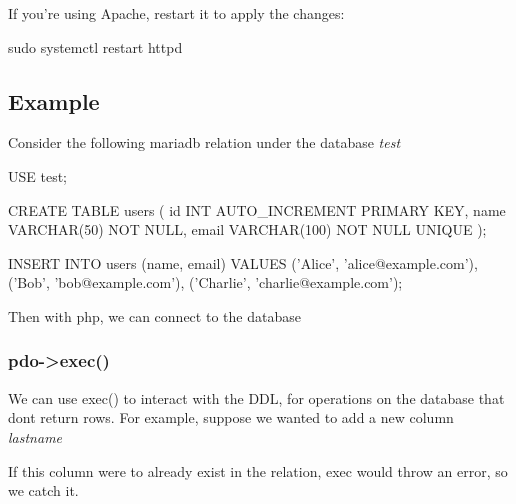 \documentclass{report}
\begin{document}
    If you’re using Apache, restart it to apply the changes:
    \bigbreak \noindent 
    \begin{bashcode}
    sudo systemctl restart httpd
    \end{bashcode}



    \pagebreak 
    \subsection{Example}
    \bigbreak \noindent 
    Consider the following mariadb relation under the database \textit{test}
    \bigbreak \noindent 
    \begin{bashcode}
        USE test;

        CREATE TABLE users (
            id INT AUTO_INCREMENT PRIMARY KEY,
            name VARCHAR(50) NOT NULL,
            email VARCHAR(100) NOT NULL UNIQUE
        );

        INSERT INTO users (name, email) VALUES
        ('Alice', 'alice@example.com'),
        ('Bob', 'bob@example.com'),
        ('Charlie', 'charlie@example.com');
    \end{bashcode}

    \bigbreak \noindent 
    Then with php, we can connect to the database
    \bigbreak \noindent 
    \bigbreak \noindent 
    \subsubsection{pdo->exec()}
    \bigbreak \noindent 
    We can use exec() to interact with the DDL, for operations on the database that dont return rows. For example, suppose we wanted to add a new column \textit{lastname}
    \bigbreak \noindent 
    \bigbreak \noindent 
    If this column were to already exist in the relation, exec would throw an error, so we catch it.
\end{document}

